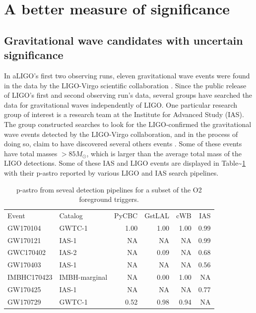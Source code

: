 \documentclass[%
 reprint,
 amsmath,amssymb,
 aps,
]{revtex4}
\begin{document}
\hypertarget{a-better-measure-of-significance}{%
\section{A better measure of significance}\label{a-better-measure-of-significance}}

\hypertarget{gravitational-wave-candidates-with-uncertain-significance}{%
\subsection{Gravitational wave candidates with uncertain significance}\label{gravitational-wave-candidates-with-uncertain-significance}}

In aLIGO's first two observing runs, eleven gravitational wave events were found in the data by the LIGO-Virgo
scientific collaboration \citep{abbott2019gwtc}. Since the public release of LIGO's first and second observing run's data,
several groups have searched the data for gravitational waves independently of LIGO. One particular research group of
interest is a research team at the Institute for Advanced Study (IAS). The group constructed searches to look for the
LIGO-confirmed the gravitational wave events detected by the LIGO-Virgo collaboration, and in the process of doing so,
claim to have discovered several others events \citep{IAS0, IAS1, IAS2}. Some of these events have total masses \(>85 M_{\odot}\), which is larger than the average total mass of the LIGO detections. Some of these IAS and LIGO events are
displayed in Table\textasciitilde\ref{tab:O2significancesWObcr} with their p-astro reported by various LIGO and IAS search pipelines.

\begin{table}[t]

\caption[p-astro for various O2 foreground triggers]{\label{tab:O2significancesWObcr}p-astro from seveal detection pipelines for a subset of the O2 foreground triggers.}
\centering
\begin{tabular}{llrrrr}
Event & Catalog & PyCBC & GstLAL & cWB & IAS\\
GW170104 & GWTC-1 & 1.00 & 1.00 & 1.00 & 0.99\\
GW170121 & IAS-1 & NA & NA & NA & 0.99\\
GWC170402 & IAS-2 & NA & 0.09 & NA & 0.68\\
GW170403 & IAS-1 & NA & NA & NA & 0.56\\
IMBHC170423 & IMBH-marginal & NA & 0.00 & 1.00 & NA\\
GW170425 & IAS-1 & NA & NA & NA & 0.77\\
GW170729 & GWTC-1 & 0.52 & 0.98 & 0.94 & NA\\
\end{tabular}
\end{table}
\end{document}
